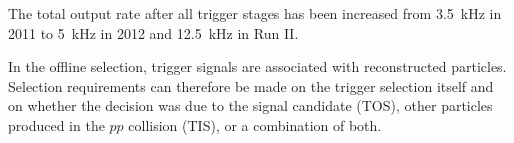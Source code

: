 The total output rate after all trigger stages has been increased from
\SI{3.5}{\kilo\hertz} in 2011 to \SI{5}{\kilo\hertz} in 2012 and
\SI{12.5}{\kilo\hertz} in Run II.

In the offline selection, trigger signals are associated with reconstructed
particles. Selection requirements can therefore be made on the trigger
selection itself and on whether the decision was due to the signal candidate
(TOS), other particles produced in the $pp$ collision (TIS), or a combination
of both.
